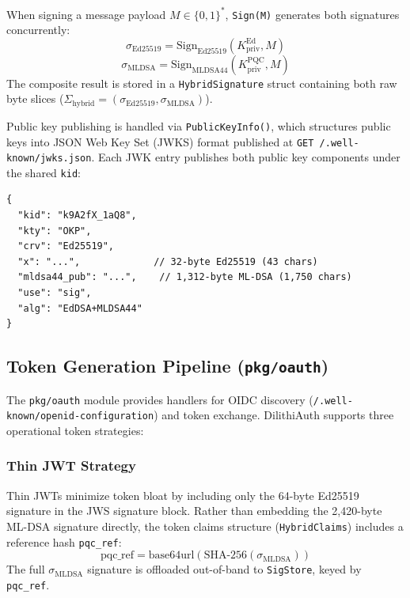 \documentclass{article}
\begin{document}
\begin{IEEEkeywords}
When signing a message payload $M \in \{0,1\}^*$, \texttt{Sign(M)} generates both signatures concurrently:
\begin{equation}
\sigma_{\text{Ed25519}} = \text{Sign}_{\text{Ed25519}}(K_{\text{priv}}^{\text{Ed}}, M)
\end{equation}
\begin{equation}
\sigma_{\text{MLDSA}} = \text{Sign}_{\text{MLDSA44}}(K_{\text{priv}}^{\text{PQC}}, M)
\end{equation}
The composite result is stored in a \texttt{HybridSignature} struct containing both raw byte slices ($\Sigma_{\text{hybrid}} = (\sigma_{\text{Ed25519}}, \sigma_{\text{MLDSA}})$).

Public key publishing is handled via \texttt{PublicKeyInfo()}, which structures public keys into JSON Web Key Set (JWKS) format published at \texttt{GET /.well-known/jwks.json}. Each JWK entry publishes both public key components under the shared \texttt{kid}:
\begin{verbatim}
{
  "kid": "k9A2fX_1aQ8",
  "kty": "OKP",
  "crv": "Ed25519",
  "x": "...",             // 32-byte Ed25519 (43 chars)
  "mldsa44_pub": "...",    // 1,312-byte ML-DSA (1,750 chars)
  "use": "sig",
  "alg": "EdDSA+MLDSA44"
}
\end{verbatim}

\subsection{Token Generation Pipeline (\texttt{pkg/oauth})}
The \texttt{pkg/oauth} module provides handlers for OIDC discovery (\texttt{/.well-known/openid-configuration}) and token exchange. DilithiAuth supports three operational token strategies:

\subsubsection{Thin JWT Strategy}
Thin JWTs minimize token bloat by including only the 64-byte Ed25519 signature in the JWS signature block. Rather than embedding the 2,420-byte ML-DSA signature directly, the token claims structure (\texttt{HybridClaims}) includes a reference hash \texttt{pqc\_ref}:
\begin{equation}
\text{pqc\_ref} = \text{base64url}\left(\text{SHA-256}(\sigma_{\text{MLDSA}})\right)
\end{equation}
The full $\sigma_{\text{MLDSA}}$ signature is offloaded out-of-band to \texttt{SigStore}, keyed by \texttt{pqc\_ref}.


\end{IEEEkeywords}
\end{document}
